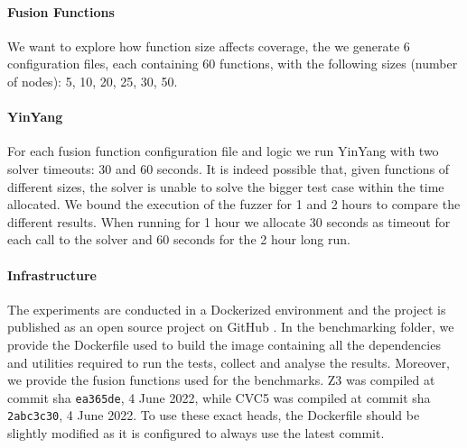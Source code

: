 \documentclass[sigplan,screen]{acmart}
\begin{document}
\paragraph{Fusion Functions} We want to explore how function size affects coverage, the we generate 6 configuration files, each containing 60 functions, with the following sizes (number of nodes): 5, 10, 20, 25, 30, 50. 

\paragraph{YinYang} For each fusion function configuration file and logic we run YinYang with two solver timeouts: 30 and 60 seconds. It is indeed possible that, given functions of different sizes, the solver is unable to solve the bigger test case within the time allocated. We bound the execution of the fuzzer for 1 and 2 hours to compare the different results. When running for 1 hour we allocate 30 seconds as timeout for each call to the solver and 60 seconds for the 2 hour long run.

\paragraph{Infrastructure} The experiments are conducted in a Dockerized environment and the project is published as an open source project on GitHub \cite{FFG}. In the benchmarking folder, we provide the Dockerfile used to build the image containing all the dependencies and utilities required to run the tests, collect and analyse the results. Moreover, we provide the fusion functions used for the benchmarks. Z3 was compiled at commit sha \texttt{ea365de}, 4 June 2022, while CVC5 was compiled at commit sha \texttt{2abc3c30}, 4 June 2022. To use these exact heads, the Dockerfile should be slightly modified as it is configured to always use the latest commit.
\end{document}
